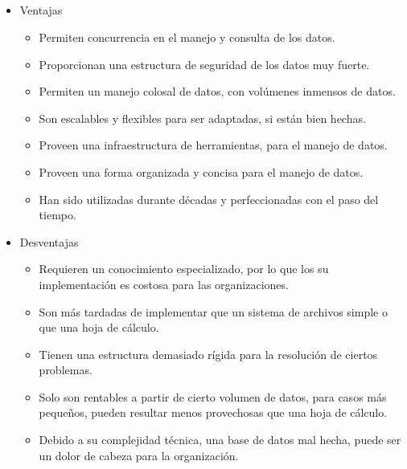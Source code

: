 \documentclass{article}
\begin{document}
\subsection{}
\begin{itemize}
    \item Ventajas
    \begin{itemize}
        \item Permiten concurrencia en el manejo y consulta de los datos.
        \item Proporcionan una estructura de seguridad de los datos muy fuerte.
        \item Permiten un manejo colosal de datos, con volúmenes inmensos de datos.
        \item Son escalables y flexibles para ser adaptadas, si están bien hechas.
        \item Proveen una infraestructura de herramientas, para el manejo de datos.
        \item Proveen una forma organizada y concisa para el manejo de datos.
        \item Han sido utilizadas durante décadas y perfeccionadas con el paso del tiempo. 
    \end{itemize}
    \item Desventajas
    \begin{itemize}
        \item Requieren un conocimiento especializado, por lo que los su implementación es costosa para las organizaciones. 
        \item Son más tardadas de implementar que un sistema de archivos simple o que una hoja de cálculo.
        \item Tienen una estructura demasiado rígida para la resolución de ciertos problemas.
        \item Solo son rentables a partir de cierto volumen de datos, para casos más pequeños, pueden resultar menos provechosas que una hoja de cálculo.
        \item Debido a su complejidad técnica, una base de datos mal hecha, puede ser un dolor de cabeza para la organización.  
    \end{itemize}
\end{itemize}
\end{document}
